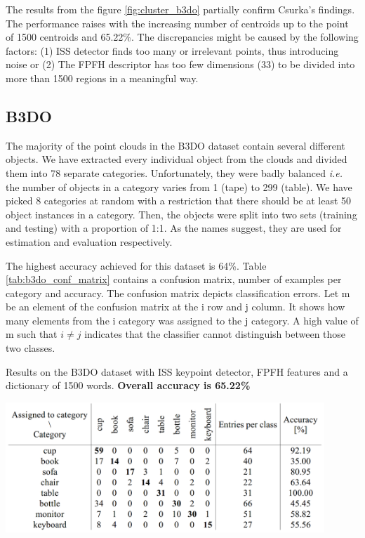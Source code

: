 	The results from the figure \ref{fig:cluster_b3do} partially confirm Csurka's findings. The performance raises with the increasing number of centroids up to the point of 1500 centroids and 65.22\%. The discrepancies might be caused by the following factors: (1) ISS detector finds too many or irrelevant points, thus introducing noise or (2) The FPFH descriptor has too few dimensions (33) to be divided into more than 1500 regions in a meaningful way. 

	
	\subsection{B3DO}
	The majority of the point clouds in the B3DO dataset contain several different objects. We have extracted every individual object from the clouds and divided them into 78 separate categories. Unfortunately, they were badly balanced \emph{i.e.} the number of objects in a category varies from 1 (tape) to 299 (table). We have picked 8 categories at random with a restriction that there should be at least 50 object instances in a category. Then, the objects were split into two sets (training and testing) with a proportion of 1:1. As the names suggest, they are used for estimation and evaluation respectively.
	
	The highest accuracy achieved for this dataset is 64\%. Table \ref{tab:b3do_conf_matrix} contains a confusion matrix, number of examples per category and accuracy. The confusion matrix depicts classification errors. Let m be an element of the confusion matrix at the i row and j column. It shows how many elements from the i category was assigned to the j category. A high value of m such that $i \neq j$ indicates that the classifier cannot distinguish between those two classes.
	
	\begin{table}[!ht]
	\centering
	\caption{Results on the B3DO dataset with ISS keypoint detector, FPFH features and a dictionary of 1500 words. \textbf{Overall accuracy is 65.22\%}}
	\includegraphics[width=0.9\textwidth]{../figs/b3do_conf_matrix}	
	\label{tab:b3do_conf_matrix}
	\end{table}
	
